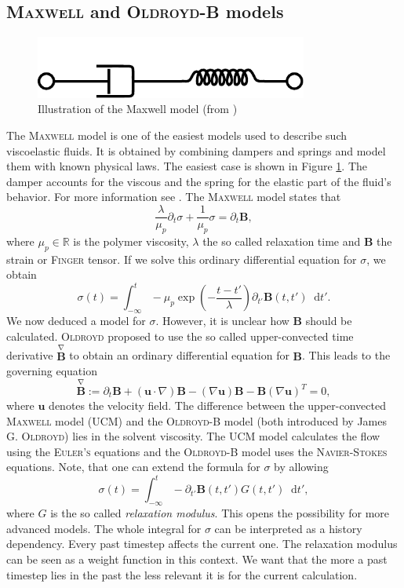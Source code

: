 \documentclass[12pt,a4paper,twoside, open=right]{scrreprt}
\theoremstyle{definition}
\theoremstyle{plain}
\newcommand{\rr}{\mathbb{R}}
\newcommand{\bfu}{\bm{u}}
\newcommand{\bfB}{\bm{B}}
\newcommand{\D}{\mathop{}\!\mathrm{d}}
\begin{document}
\subsection{\textsc{Maxwell} and \textsc{Oldroyd-B} models}
\begin{figure}
    \centering
    \includegraphics[width=0.8\textwidth]{Maxwell_diagram.pdf}
    \caption{Illustration of the Maxwell model (from \cite{Pekaje})}
    \label{fig:maxwell}
\end{figure}
The \textsc{Maxwell} model is one of the easiest models used to describe such viscoelastic fluids. It is obtained by combining dampers and springs and model them with known physical laws. The easiest case is shown in Figure \ref{fig:maxwell}. The damper accounts for the viscous  and the spring for the elastic part of the fluid's behavior. For more information see \cite{Owens2002}. The \textsc{Maxwell} model states that
\begin{equation}
    \frac{\lambda}{\mu_p}\partial_t\sigma +\frac{1}{\mu_p}\sigma = \partial_t \bfB,
\end{equation}
where $\mu_p\in\rr$ is the polymer viscosity, $\lambda$ the so called relaxation time and $\bfB$ the strain or \textsc{Finger} tensor. If we solve this ordinary differential equation for $\sigma$, we obtain
\begin{equation}
    \sigma(t)=\int_{-\infty}^{t}-\mu_p\exp\left(-\frac{t-t'}{\lambda}\right)\partial_{t'} \bfB(t,t')\D t'.
\end{equation}
We now deduced a model for $\sigma$. However, it is unclear how $\bfB$ should be calculated.
\textsc{Oldroyd} proposed to use the so called upper-convected time derivative $\overset{\nabla}{\bfB}$ to obtain an ordinary differential equation for $\bfB$. This leads to the governing equation
\begin{equation}
    \overset{\nabla}{\bfB}:=\partial_t \bfB  + (\bfu\cdot \nabla)\bfB-(\nabla \bfu)\bfB-\bfB(\nabla\bfu)^T=0,
\end{equation}
where $\bfu$ denotes the velocity field. The difference between the upper-convected \textsc{Maxwell} model (UCM) and the \textsc{Oldroyd-B} model (both introduced by James G. \textsc{Oldroyd}) lies in the solvent viscosity. The UCM model calculates the flow using the \textsc{Euler's} equations and the \textsc{Oldroyd-B} model uses the \textsc{Navier-Stokes} equations. Note, that one can extend the formula for $\sigma$ by allowing
\begin{equation}
    \sigma(t)=\int_{-\infty}^{t}-\partial_{t'}\bfB(t,t')G(t,t')\D t',
\end{equation}
where $G$ is the so called \emph{relaxation modulus}. This opens the possibility for more advanced models. The whole integral for $\sigma$ can be interpreted as a history dependency. Every past timestep affects the current one. The relaxation modulus can be seen as a weight function in this context. We want that the more a past timestep lies in the past the less relevant it is for the current calculation.
\end{document}
